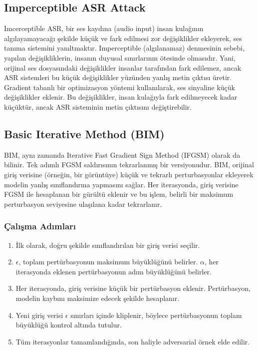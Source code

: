 \newpage

\subsection{Imperceptible ASR Attack}

Imcerceptible ASR, bir ses kaydına (audio input) insan kulağının algılayamayacağı şekilde küçük ve fark edilmesi zor değişiklikler ekleyerek, ses tanıma sistemini yanıltmaktır. Imperceptible (algılanamaz) denmesinin sebebi, yapılan değişikliklerin, insanın duyusal sınırlarının ötesinde olmasıdır. Yani, orijinal ses dosyasındaki değişiklikler insanlar tarafından fark edilemez, ancak ASR sistemleri bu küçük değişiklikler yüzünden yanlış metin çıktısı üretir. Gradient tabanlı bir optimizasyon yöntemi kullanılarak, ses sinyaline küçük değişiklikler eklenir. Bu değişiklikler, insan kulağıyla fark edilmeyecek kadar küçüktür, ancak ASR sisteminin metin çıktısını değiştirebilir.

\newpage

\subsection{Basic Iterative Method (BIM)}

BIM, aynı zamanda Iterative Fast Gradient Sign Method (IFGSM) olarak da bilinir. Tek adımlı FGSM saldırısının tekrarlanmış bir versiyonudur. BIM, orijinal giriş verisine (örneğin, bir görüntüye) küçük ve tekrarlı perturbasyonlar ekleyerek modelin yanlış sınıflandırma yapmasını sağlar. Her iterasyonda, giriş verisine FGSM ile hesaplanan bir gürültü eklenir ve bu işlem, belirli bir maksimum perturbasyon seviyesine ulaşılana kadar tekrarlanır.

\subsubsection{Çalışma Adımları}

\begin{enumerate}
    \item İlk olarak, doğru şekilde sınıflandırılan bir giriş verisi seçilir.
    \item $\epsilon$, toplam pertürbasyonun maksimum büyüklüğünü belirler. $\alpha$, her iterasyonda eklenen pertürbasyonun adım büyüklüğünü belirler.
    \item Her iterasyonda, giriş verisine küçük bir pertürbasyon eklenir. Pertürbasyon, modelin kaybını maksimize edecek şekilde hesaplanır.
    \item Yeni giriş verisi $\epsilon$ sınırları içinde kliplenir, böylece pertürbasyonun toplam büyüklüğü kontrol altında tutulur.
    \item Tüm iterasyonlar tamamlandığında, son haliyle adversarial örnek elde edilir.
\end{enumerate}

